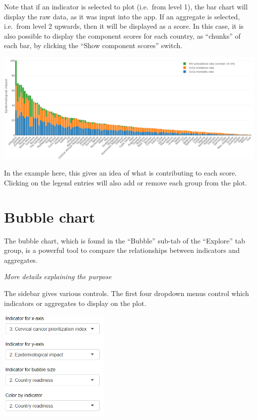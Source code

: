 \documentclass[
  letterpaper,
  DIV=11,
  numbers=noendperiod]{scrreprt}
\begin{document}
Note that if an indicator is selected to plot (i.e.~from level 1), the
bar chart will display the raw data, as it was input into the app. If an
aggregate is selected, i.e.~from level 2 upwards, then it will be
displayed as a score. In this case, it is also possible to display the
component scores for each country, as ``chunks'' of each bar, by
clicking the ``Show component scores'' switch.

\includegraphics[width=1\textwidth,height=\textheight]{figs/map_bar_5.png}

In the example here, this gives an idea of what is contributing to each
score. Clicking on the legend entries will also add or remove each group
from the plot.

\hypertarget{sec-bubble}{%
\chapter{Bubble chart}\label{sec-bubble}}

The bubble chart, which is found in the ``Bubble'' sub-tab of the
``Explore'' tab group, is a powerful tool to compare the relationships
between indicators and aggregates.

\emph{More details explaining the purpose}

The sidebar gives various controls. The first four dropdown menus
control which indicators or aggregates to display on the plot.

\includegraphics[width=0.4\textwidth,height=\textheight]{figs/bubble_1.png}
\end{document}
